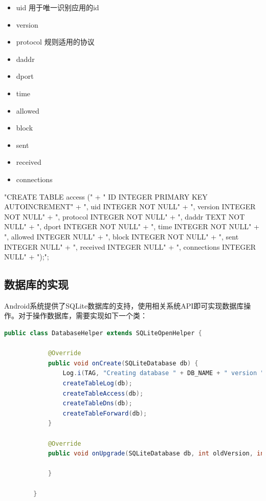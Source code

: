 \documentclass[format=final, language=chinese, degree=fyp]{hustthesis}
\begin{document}
\begin{itemize}
    \item uid           用于唯一识别应用的id
    \item version
    \item protocol      规则适用的协议
    \item daddr
    \item dport

    \item time
    \item allowed
    \item block

    \item sent
    \item received
    \item connections
\end{itemize}

"CREATE TABLE access (" +
                " ID INTEGER PRIMARY KEY AUTOINCREMENT" +
                ", uid INTEGER NOT NULL" +
                ", version INTEGER NOT NULL" +
                ", protocol INTEGER NOT NULL" +
                ", daddr TEXT NOT NULL" +
                ", dport INTEGER NOT NULL" +
                ", time INTEGER NOT NULL" +
                ", allowed INTEGER NULL" +
                ", block INTEGER NOT NULL" +
                ", sent INTEGER NULL" +
                ", received INTEGER NULL" +
                ", connections INTEGER NULL" +
                ");";

\subsection{数据库的实现}

   Android系统提供了SQLite数据库的支持，使用相关系统API即可实现数据库操作。对于操作数据库，需要实现如下一个类：

\begin{lstlisting}[language=java]
        public class DatabaseHelper extends SQLiteOpenHelper {

            @Override
            public void onCreate(SQLiteDatabase db) {
                Log.i(TAG, "Creating database " + DB_NAME + " version " + DB_VERSION);
                createTableLog(db);
                createTableAccess(db);
                createTableDns(db);
                createTableForward(db);
            }

            @Override
            public void onUpgrade(SQLiteDatabase db, int oldVersion, int newVersion) {

            }

        }
\end{lstlisting}
\end{document}
